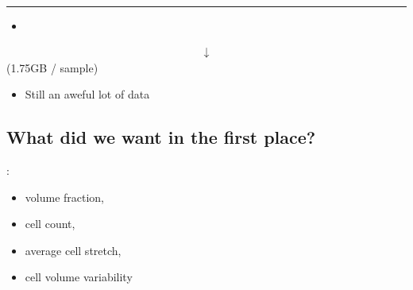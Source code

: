 \documentclass[letterpaper,10pt,english]{sphinxmanual}
\begin{document}
\bigskip\hrule\bigskip

\begin{itemize}
\item {} 
\sphinxAtStartPar
{}

\end{itemize}
\begin{equation*}
\begin{split}\downarrow\end{split}
\end{equation*}
\sphinxAtStartPar
{}
(1.75GB / sample)
\begin{itemize}
\item {} 
\sphinxAtStartPar
Still an aweful lot of data

\end{itemize}


\subsection{What did we want in the first place?}
\label{\detokenize{06-ShapeAnalysis:what-did-we-want-in-the-first-place}}
\sphinxAtStartPar
{} :
\begin{itemize}
\item {} 
\sphinxAtStartPar
volume fraction,

\item {} 
\sphinxAtStartPar
cell count,

\item {} 
\sphinxAtStartPar
average cell stretch,

\item {} 
\sphinxAtStartPar
cell volume variability

\end{itemize}
\end{document}
